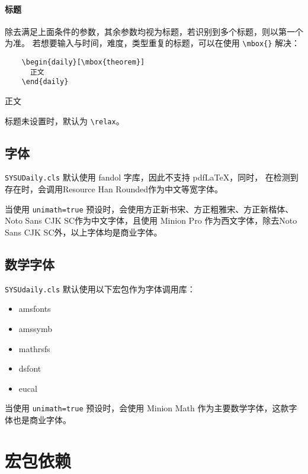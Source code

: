 \documentclass{SYSUDaily}
\begin{document}
\paragraph{标题}
除去满足上面条件的参数，其余参数均视为标题，若识别到多个标题，则以第一个为准。
若想要输入与时间，难度，类型重复的标题，可以在使用 \verb|\mbox{}| 解决：
\begin{multicols}{2}
	\begin{lstlisting}
    \begin{daily}[\mbox{theorem}]
      正文
    \end{daily}
  \end{lstlisting}
	\small
	\begin{daily}
		正文
	\end{daily}
\end{multicols}
标题未设置时，默认为 \verb|\relax|。

\subsection{字体}
\verb|SYSUDaily.cls| 默认使用 \textsf{fandol} 字库，因此不支持 pdf\LaTeX{}，同时，
在检测到存在时，会调用Resource Han Rounded作为中文等宽字体。

当使用 \verb|unimath=true| 预设时，会使用方正新书宋、方正粗雅宋、方正新楷体、Noto Sans CJK SC作为中文字体，且使用 Minion Pro 作为西文字体，除去Noto Sans CJK SC外，以上字体均是商业字体。

\subsection{数学字体}
\label{ssec:math_fonts}
\verb|SYSUdaily.cls| 默认使用以下宏包作为字体调用库：
\begin{itemize}[parsep=0pt,itemsep=0pt]
	\item
	      \textsf{amsfonts}
	\item
	      \textsf{amssymb}
	\item
	      \textsf{mathrsfs}
	\item
	      \textsf{dsfont}
	\item
	      \textsf{eucal}
\end{itemize}
当使用 \verb|unimath=true| 预设时，会使用 Minion Math 作为主要数学字体，这款字体也是商业字体。

\section{宏包依赖}
\end{document}
